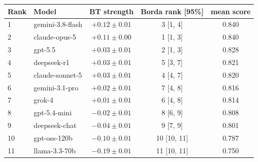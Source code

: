 \begin{tabular}{llccc}
\toprule
Rank & Model & BT strength & Borda rank [95\%] & mean score \\
\midrule
1 & gemini-3.8-flash & $+0.12 \pm 0.01$ & 3 [1, 4] & 0.840 \\
2 & claude-opus-5 & $+0.11 \pm 0.00$ & 1 [1, 3] & 0.840 \\
3 & gpt-5.5 & $+0.03 \pm 0.01$ & 2 [1, 3] & 0.828 \\
4 & deepseek-r1 & $+0.03 \pm 0.01$ & 5 [3, 7] & 0.821 \\
5 & claude-sonnet-5 & $+0.03 \pm 0.01$ & 4 [4, 7] & 0.820 \\
6 & gemini-3.1-pro & $+0.02 \pm 0.01$ & 7 [4, 8] & 0.816 \\
7 & grok-4 & $+0.01 \pm 0.01$ & 6 [4, 8] & 0.814 \\
8 & gpt-5.4-mini & $-0.02 \pm 0.01$ & 8 [6, 9] & 0.808 \\
9 & deepseek-chat & $-0.04 \pm 0.01$ & 9 [7, 9] & 0.801 \\
10 & gpt-oss-120b & $-0.10 \pm 0.01$ & 10 [10, 11] & 0.787 \\
11 & llama-3.3-70b & $-0.19 \pm 0.01$ & 11 [10, 11] & 0.750 \\
\bottomrule
\end{tabular}
